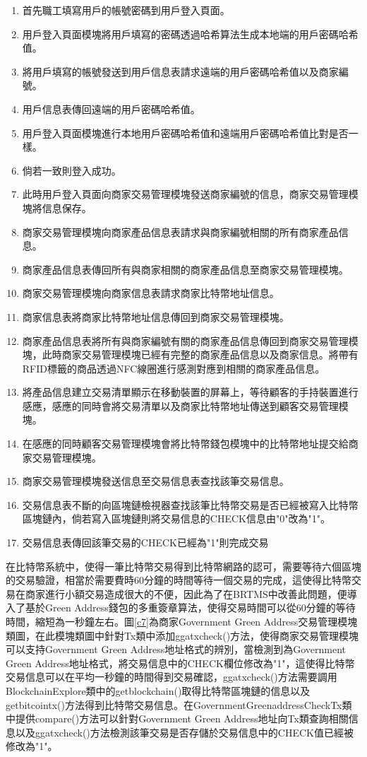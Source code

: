 	\begin{enumerate}
	\item 首先職工填寫用戶的帳號密碼到用戶登入頁面。
	\item 用戶登入頁面模塊將用戶填寫的密碼透過哈希算法生成本地端的用戶密碼哈希值。
	\item 將用戶填寫的帳號發送到用戶信息表請求遠端的用戶密碼哈希值以及商家編號。
	\item 用戶信息表傳回遠端的用戶密碼哈希值。
	\item 用戶登入頁面模塊進行本地用戶密碼哈希值和遠端用戶密碼哈希值比對是否一樣。
	\item 倘若一致則登入成功。
	\item 此時用戶登入頁面向商家交易管理模塊發送商家編號的信息，商家交易管理模塊將信息保存。
	\item 商家交易管理模塊向商家產品信息表請求與商家編號相關的所有商家產品信息。
	\item 商家產品信息表傳回所有與商家相關的商家產品信息至商家交易管理模塊。
	\item 商家交易管理模塊向商家信息表請求商家比特幣地址信息。
	\item 商家信息表將商家比特幣地址信息傳回到商家交易管理模塊。
	\item 商家產品信息表將所有與商家編號有關的商家產品信息傳回到商家交易管理模塊，此時商家交易管理模塊已經有完整的商家產品信息以及商家信息。將帶有RFID標籤的商品透過NFC線圈進行感測對應到相關的商家產品信息。
	\item 將產品信息建立交易清單顯示在移動裝置的屏幕上，等待顧客的手持裝置進行感應，感應的同時會將交易清單以及商家比特幣地址傳送到顧客交易管理模塊。

	\item 在感應的同時顧客交易管理模塊會將比特幣錢包模塊中的比特幣地址提交給商家交易管理模塊。
	\item 商家交易管理模塊發送信息至交易信息表查找該筆交易信息。
	\item 交易信息表不斷的向區塊鏈檢視器查找該筆比特幣交易是否已經被寫入比特幣區塊鏈內，倘若寫入區塊鏈則將交易信息的CHECK信息由"0"改為"1"。
	\item 交易信息表傳回該筆交易的CHECK已經為"1"則完成交易
	
	\end{enumerate}

	在比特幣系統中，使得一筆比特幣交易得到比特幣網路的認可，需要等待六個區塊的交易驗證，相當於需要費時60分鐘的時間等待一個交易的完成，這使得比特幣交易在商家進行小額交易造成很大的不便，因此為了在BRTMS中改善此問題，便導入了基於Green Address錢包的多重簽章算法，使得交易時間可以從60分鐘的等待時間，縮短為一秒鐘左右。圖\ref{c7}為商家Government Green Address交易管理模塊類圖，在此模塊類圖中針對Tx類中添加ggatxcheck()方法，使得商家交易管理模塊可以支持Government Green Address地址格式的辨別，當檢測到為Government Green Address地址格式，將交易信息中的CHECK欄位修改為"1"，這使得比特幣交易信息可以在平均一秒鐘的時間得到交易確認，ggatxcheck()方法需要調用BlockchainExplore類中的getblockchain()取得比特幣區塊鏈的信息以及getbitcointx()方法得到比特幣交易信息。在GovernmentGreenaddressCheckTx類中提供compare()方法可以針對Government Green Address地址向Tx類查詢相關信息以及ggatxcheck()方法檢測該筆交易是否存儲於交易信息中的CHECK值已經被修改為"1"。

